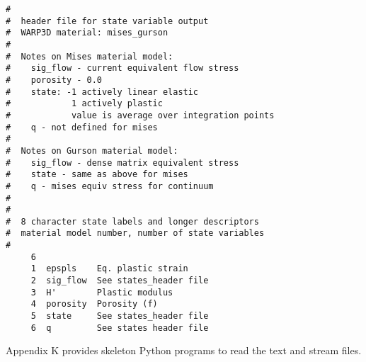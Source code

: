 \documentclass[11pt]{report}
\numberwithin{equation}{section}
\newcommand{\nin} {\noindent}
\begin{document}
\small
\begin{verbatim}
#
#  header file for state variable output
#  WARP3D material: mises_gurson        
#   
#  Notes on Mises material model:
#    sig_flow - current equivalent flow stress
#    porosity - 0.0
#    state: -1 actively linear elastic
#            1 actively plastic
#            value is average over integration points
#    q - not defined for mises
#  
#  Notes on Gurson material model:
#    sig_flow - dense matrix equivalent stress
#    state - same as above for mises
#    q - mises equiv stress for continuum
#   
#
#  8 character state labels and longer descriptors
#  material model number, number of state variables 
#
     6
     1  epspls    Eq. plastic strain                                          
     2  sig_flow  See states_header file                                      
     3  H'        Plastic modulus                                             
     4  porosity  Porosity (f)                                                
     5  state     See states_header file                                      
     6  q         See states header file                                      
\end{verbatim}
\normalsize


\nin Appendix K provides skeleton Python programs to read the text and stream
files. 
\end{document}
